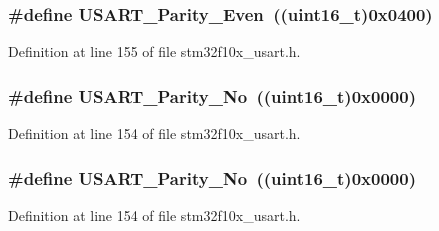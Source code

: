 \subsubsection[{\texorpdfstring{U\+S\+A\+R\+T\+\_\+\+Parity\+\_\+\+Even}{USART_Parity_Even}}]{\setlength{\rightskip}{0pt plus 5cm}\#define U\+S\+A\+R\+T\+\_\+\+Parity\+\_\+\+Even~(({\bf uint16\+\_\+t})0x0400)}\hypertarget{group___u_s_a_r_t___parity_ga62193247d36fffe982e159c1f246271e}{}\label{group___u_s_a_r_t___parity_ga62193247d36fffe982e159c1f246271e}


Definition at line 155 of file stm32f10x\+\_\+usart.\+h.

\subsubsection[{\texorpdfstring{U\+S\+A\+R\+T\+\_\+\+Parity\+\_\+\+No}{USART_Parity_No}}]{\setlength{\rightskip}{0pt plus 5cm}\#define U\+S\+A\+R\+T\+\_\+\+Parity\+\_\+\+No~(({\bf uint16\+\_\+t})0x0000)}\hypertarget{group___u_s_a_r_t___parity_gab9deebcb0a859360dfec85074abaa3aa}{}\label{group___u_s_a_r_t___parity_gab9deebcb0a859360dfec85074abaa3aa}


Definition at line 154 of file stm32f10x\+\_\+usart.\+h.

\subsubsection[{\texorpdfstring{U\+S\+A\+R\+T\+\_\+\+Parity\+\_\+\+No}{USART_Parity_No}}]{\setlength{\rightskip}{0pt plus 5cm}\#define U\+S\+A\+R\+T\+\_\+\+Parity\+\_\+\+No~(({\bf uint16\+\_\+t})0x0000)}\hypertarget{group___u_s_a_r_t___parity_gab9deebcb0a859360dfec85074abaa3aa}{}\label{group___u_s_a_r_t___parity_gab9deebcb0a859360dfec85074abaa3aa}


Definition at line 154 of file stm32f10x\+\_\+usart.\+h.

